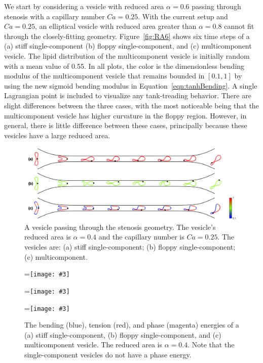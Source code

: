 \documentclass[twoside,twocolumn,9pt]{article}
\newcommand{\subfigimg}[3][,]{%
  \setbox1=\hbox{\texttt{[image: \#3]}}%
  \leavevmode\rlap{\usebox1}%
  \rlap{\hspace*{0pt}\raisebox{\dimexpr\ht1-0\baselineskip}{\bf
  \normalsize #2}}%
  \phantom{\usebox1}%
}
\begin{document}
We start by considering a vesicle with reduced area $\alpha = 0.6$
passing through stenosis with a capillary number $Ca = 0.25$.  With the
current setup and $Ca=0.25$, an elliptical vesicle with reduced area
greater than $\alpha = 0.8$ cannot fit through the closely-fitting
geometry. Figure~\ref{fig:RA6} shows six time steps of a (a) stiff
single-component (b) floppy single-component, and (c) multicomponent
vesicle. The lipid distribution of the multicomponent vesicle is
initially random with a mean value of 0.55. In all plots, the color is
the dimensionless bending modulus of the multicomponent vesicle that
remains bounded in $[0.1,1]$ by using the new sigmoid bending modulus in
Equation~\eqref{eqn:tanhBending}. A single Lagrangian point is included
to visualize any tank-treading behavior. There are slight differences
between the three cases, with the most noticeable being that the
multicomponent vesicle has higher curvature in the floppy region.
However, in general, there is little difference between these cases,
principally because these vesicles have a large reduced area. 

\begin{figure}[h]
  \centering
  \includegraphics[width=0.9\linewidth]{figures/STENOSIS_RAp4MCp5.pdf}
  \caption{\label{fig:RA4} \small A vesicle passing through the stenosis
  geometry. The vesicle's reduced area is $\alpha = 0.4$ and the
  capillary number is $Ca = 0.25$. The vesicles are: (a) stiff
  single-component; (b) floppy single-component; (c) multicomponent.}
\end{figure}

\begin{figure}[ht]
  \centering
  \subfigimg[width=0.3\linewidth]{(a)}{figures/SC_energy.pdf}
  \subfigimg[width=0.3\linewidth]{(b)}{figures/SCp55_energy.pdf}
  \subfigimg[width=0.3\linewidth]{(c)}{figures/MCp5_energy.pdf}
  \caption{\label{fig:Energy} \small The bending (blue), tension (red),
  and phase (magenta) energies of a (a) stiff single-component, (b)
  floppy single-component, and (c) multicomponent vesicle. The reduced
  area is $\alpha = 0.4$. Note that the single-component vesicles do not
  have a phase energy.} 
\end{figure}
\end{document}
